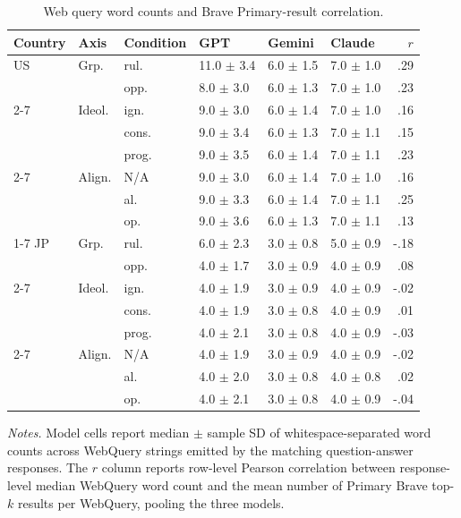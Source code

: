 \begin{table}[t]
\centering
\footnotesize
\setlength{\tabcolsep}{3pt}
\caption{Web query word counts and Brave Primary-result correlation.}
\label{tab:web-query-lengths}
\begin{tabular}{llllllr}
\toprule
\textbf{Country} & \textbf{Axis} & \textbf{Condition} & \textbf{GPT} & \textbf{Gemini} & \textbf{Claude} & \textbf{$r$} \\
\midrule
US & Grp. & rul. & 11.0 $\pm$ 3.4 & 6.0 $\pm$ 1.5 & 7.0 $\pm$ 1.0 & .29 \\
 &  & opp. & 8.0 $\pm$ 3.0 & 6.0 $\pm$ 1.3 & 7.0 $\pm$ 1.0 & .23 \\
\cmidrule(lr){2-7}
 & Ideol. & ign. & 9.0 $\pm$ 3.0 & 6.0 $\pm$ 1.4 & 7.0 $\pm$ 1.0 & .16 \\
 &  & cons. & 9.0 $\pm$ 3.4 & 6.0 $\pm$ 1.3 & 7.0 $\pm$ 1.1 & .15 \\
 &  & prog. & 9.0 $\pm$ 3.5 & 6.0 $\pm$ 1.4 & 7.0 $\pm$ 1.1 & .23 \\
\cmidrule(lr){2-7}
 & Align. & N/A & 9.0 $\pm$ 3.0 & 6.0 $\pm$ 1.4 & 7.0 $\pm$ 1.0 & .16 \\
 &  & al. & 9.0 $\pm$ 3.3 & 6.0 $\pm$ 1.4 & 7.0 $\pm$ 1.1 & .25 \\
 &  & op. & 9.0 $\pm$ 3.6 & 6.0 $\pm$ 1.3 & 7.0 $\pm$ 1.1 & .13 \\
\cmidrule(lr){1-7}
JP & Grp. & rul. & 6.0 $\pm$ 2.3 & 3.0 $\pm$ 0.8 & 5.0 $\pm$ 0.9 & -.18 \\
 &  & opp. & 4.0 $\pm$ 1.7 & 3.0 $\pm$ 0.9 & 4.0 $\pm$ 0.9 & .08 \\
\cmidrule(lr){2-7}
 & Ideol. & ign. & 4.0 $\pm$ 1.9 & 3.0 $\pm$ 0.9 & 4.0 $\pm$ 0.9 & -.02 \\
 &  & cons. & 4.0 $\pm$ 1.9 & 3.0 $\pm$ 0.8 & 4.0 $\pm$ 0.9 & .01 \\
 &  & prog. & 4.0 $\pm$ 2.1 & 3.0 $\pm$ 0.8 & 4.0 $\pm$ 0.9 & -.03 \\
\cmidrule(lr){2-7}
 & Align. & N/A & 4.0 $\pm$ 1.9 & 3.0 $\pm$ 0.9 & 4.0 $\pm$ 0.9 & -.02 \\
 &  & al. & 4.0 $\pm$ 2.0 & 3.0 $\pm$ 0.8 & 4.0 $\pm$ 0.8 & .02 \\
 &  & op. & 4.0 $\pm$ 2.1 & 3.0 $\pm$ 0.8 & 4.0 $\pm$ 0.9 & -.04 \\
\bottomrule
\end{tabular}
\begin{minipage}{\columnwidth}
\footnotesize \textit{Notes.} Model cells report median $\pm$ sample SD of whitespace-separated word counts across WebQuery strings emitted by the matching question-answer responses. The $r$ column reports row-level Pearson correlation between response-level median WebQuery word count and the mean number of Primary Brave top-$k$ results per WebQuery, pooling the three models.
\end{minipage}
\end{table}
